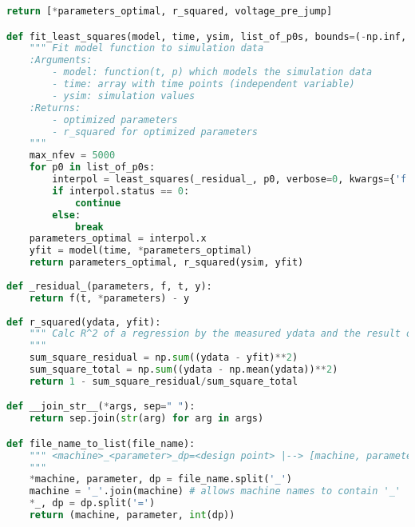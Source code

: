 \begin{lstlisting}[language=python, caption=Auszug aus \texttt{modelicaSweep.py}, label=lst:ModelicaSweep,frame=single,framerule=0pt]
    return [*parameters_optimal, r_squared, voltage_pre_jump]

def fit_least_squares(model, time, ysim, list_of_p0s, bounds=(-np.inf, np.inf)):
    """ Fit model function to simulation data
    :Arguments: 
        - model: function(t, p) which models the simulation data
        - time: array with time points (independent variable)
        - ysim: simulation values
    :Returns:
        - optimized parameters
        - r_squared for optimized parameters
    """
    max_nfev = 5000
    for p0 in list_of_p0s:
        interpol = least_squares(_residual_, p0, verbose=0, kwargs={'f':model, 'y':ysim, 't':time}, max_nfev=max_nfev, bounds=bounds)
        if interpol.status == 0:
            continue
        else:
            break
    parameters_optimal = interpol.x
    yfit = model(time, *parameters_optimal)
    return parameters_optimal, r_squared(ysim, yfit)
    
def _residual_(parameters, f, t, y):
    return f(t, *parameters) - y
    
def r_squared(ydata, yfit):
    """ Calc R^2 of a regression by the measured ydata and the result of the curve fitting yfit
    """
    sum_square_residual = np.sum((ydata - yfit)**2)
    sum_square_total = np.sum((ydata - np.mean(ydata))**2)
    return 1 - sum_square_residual/sum_square_total

def __join_str__(*args, sep=" "):
    return sep.join(str(arg) for arg in args)

def file_name_to_list(file_name):
    """ <machine>_<parameter>_dp=<design point> |--> [machine, parameter, design point]
    """
    *machine, parameter, dp = file_name.split('_')
    machine = '_'.join(machine) # allows machine names to contain '_'
    *_, dp = dp.split('=')
    return (machine, parameter, int(dp))
\end{lstlisting}

